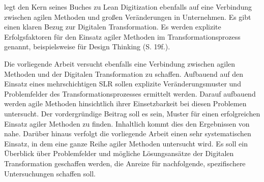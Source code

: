  legt den Kern seines Buches zu Lean Digitization ebenfalls auf eine Verbindung zwischen agilen Methoden und großen Veränderungen in Unternehmen. Es gibt einen klaren Bezug zur Digitalen Transformation. Es werden explizite Erfolgsfaktoren für den Einsatz agiler Methoden im Transformationsprozess genannt, beispielsweise für Design Thinking (S. 19f.). 

Die vorliegende Arbeit versucht ebenfalls eine Verbindung zwischen agilen Methoden und der Digitalen Transformation zu schaffen. Aufbauend auf den Einsatz eines mehrschichtigen SLR sollen explizite Veränderungsmuster und Problemfelder des Transformationsprozesses ermittelt werden. Darauf aufbauend werden agile Methoden hinsichtlich ihrer Einsetzbarkeit bei diesen Problemen untersucht. Der vordergründige Beitrag soll es sein, Muster für einen erfolgreichen Einsatz agiler Methoden zu finden. Inhaltlich kommt dies den Ergebnissen von  nahe. Darüber hinaus verfolgt die vorliegende Arbeit einen sehr systematischen Einsatz, in dem eine ganze Reihe agiler Methoden untersucht wird. Es soll ein Überblick über Problemfelder und mögliche Lösungsansätze der Digitalen Transformation geschaffen werden, die Anreize für nachfolgende, spezifischere Untersuchungen schaffen soll.
